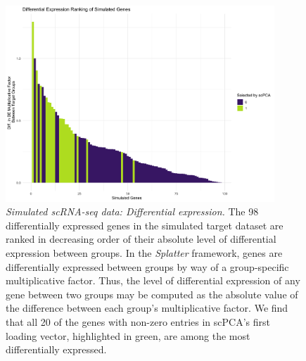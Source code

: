 \documentclass{article}
\begin{document}
\begin{figure}[!htbp]
    \centering
    \includegraphics[width=0.9\textwidth]{figures/sim_de_genes}
    \caption{{\em Simulated scRNA-seq data: Differential expression.}
    The 98 differentially expressed genes in the simulated target dataset are ranked in decreasing order of their absolute level of differential expression between groups. In the \textit{Splatter} framework, genes are differentially expressed between groups by way of a group-specific multiplicative factor. Thus, the level of differential expression of any gene between two groups may be computed as the absolute value of the difference between each group's multiplicative factor. We find that all 20 of the genes with non-zero entries in scPCA's first loading vector, highlighted in green, are among the most differentially expressed.}
    \label{fig:sim_de_genes}
\end{figure}
\end{document}
